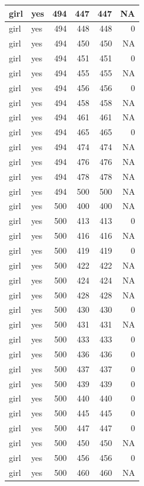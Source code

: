 \documentclass[man]{apa6}
\begin{document}
\begin{tabular}{l|l|r|r|r|r}
\hline
girl & yes & 494 & 447 & 447 & NA\\
\hline
girl & yes & 494 & 448 & 448 & 0\\
\hline
girl & yes & 494 & 450 & 450 & NA\\
\hline
girl & yes & 494 & 451 & 451 & 0\\
\hline
girl & yes & 494 & 455 & 455 & NA\\
\hline
girl & yes & 494 & 456 & 456 & 0\\
\hline
girl & yes & 494 & 458 & 458 & NA\\
\hline
girl & yes & 494 & 461 & 461 & NA\\
\hline
girl & yes & 494 & 465 & 465 & 0\\
\hline
girl & yes & 494 & 474 & 474 & NA\\
\hline
girl & yes & 494 & 476 & 476 & NA\\
\hline
girl & yes & 494 & 478 & 478 & NA\\
\hline
girl & yes & 494 & 500 & 500 & NA\\
\hline
girl & yes & 500 & 400 & 400 & NA\\
\hline
girl & yes & 500 & 413 & 413 & 0\\
\hline
girl & yes & 500 & 416 & 416 & NA\\
\hline
girl & yes & 500 & 419 & 419 & 0\\
\hline
girl & yes & 500 & 422 & 422 & NA\\
\hline
girl & yes & 500 & 424 & 424 & NA\\
\hline
girl & yes & 500 & 428 & 428 & NA\\
\hline
girl & yes & 500 & 430 & 430 & 0\\
\hline
girl & yes & 500 & 431 & 431 & NA\\
\hline
girl & yes & 500 & 433 & 433 & 0\\
\hline
girl & yes & 500 & 436 & 436 & 0\\
\hline
girl & yes & 500 & 437 & 437 & 0\\
\hline
girl & yes & 500 & 439 & 439 & 0\\
\hline
girl & yes & 500 & 440 & 440 & 0\\
\hline
girl & yes & 500 & 445 & 445 & 0\\
\hline
girl & yes & 500 & 447 & 447 & 0\\
\hline
girl & yes & 500 & 450 & 450 & NA\\
\hline
girl & yes & 500 & 456 & 456 & 0\\
\hline
girl & yes & 500 & 460 & 460 & NA\\

\end{tabular}
\end{document}
